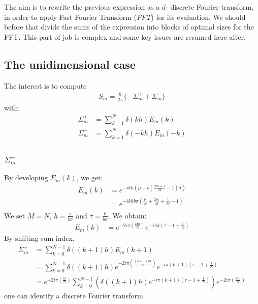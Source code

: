 The aim is to rewrite the previous expression as a $d$- discrete Fourier transform, in order to apply Fast Fourier Transform (\emph{FFT}) for its evaluation.
We should before that divide the sums of the expression into blocks of optimal sizes for the FFT. This part of job is complex and some key issues are resumed here after.

\subsection{The unidimensional case}

The interest is to compute
\begin{align}
S_{m}=\frac{h}{2\pi}\Big\{&\Sigma_{m}^{+} + \Sigma_{m}^{-} \Big\}
\end{align}
with:
\begin{align}
\Sigma_{m}^{+}&=\sum_{k=1}^{N}\delta( kh)E_{m}(k)\\
\Sigma_{m}^{-}&=\sum_{k=1}^{N}\delta(-kh)E_{m}(-k)\\
\end{align}

\subsubsection{\texorpdfstring{$\Sigma_{m}^{+}$}{sigma+}}
By developing $E_m(k)$, we get:
\begin{align*}
E_{m}(k)&=e^{-ikh\left(\mu+b\left(\frac{2m+1}{M}-1\right)\sigma\right)}\\
&=e^{-ikhb\sigma\left(\frac{\mu}{b\sigma}+\frac{2m}{M}+\frac{1}{M}-1\right)}\\
\end{align*}
We set $M=N$, $h=\frac{\pi}{b\sigma}$ and $\tau=\frac{\mu}{b\sigma}$. We obtain:
\begin{align*}
E_{m}(k)&=e^{-2i\pi\left(\frac{k m}{N}\right)}e^{-i\pi k\left(\tau-1+\frac{1}{N}\right)}
\end{align*}
By shifting sum index,
\begin{align*}
\Sigma_{m}^{+}&=\sum_{k=0}^{N-1}\delta((k+1)h)E_{m}(k+1)\\
  &=\sum_{k=0}^{N-1}\delta((k+1)h) e^{-2i\pi\left(\frac{(k+1) m}{N}\right)} e^{-i\pi (k+1)\left(\tau-1+\frac{1}{N}\right)}\\
  &=e^{-2i\pi\left(\frac{m}{N}\right)} \sum_{k=0}^{N-1}\left(\delta((k+1)h) e^{-i\pi (k+1)\left(\tau-1+\frac{1}{N}\right)}\right) e^{-2i\pi\left(\frac{k m}{N}\right)} 
\end{align*}
one can identify a discrete Fourier transform.

